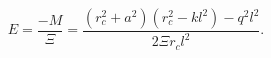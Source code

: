 \begin{equation}
\label{3eq3} E=\frac{-M}{\Xi} =\frac{(r_c^2+a^2)(r_c^2-k l^2)-q^2
l^2}{2\Xi r_c l^2}. \label{kmass}
\end{equation}

